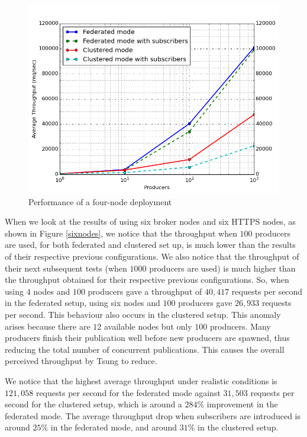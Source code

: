 \documentclass[conference, 10pt]{IEEEtran}
\begin{document}
\begin{figure}
 \includegraphics[width=\linewidth, height=\linewidth, keepaspectratio]{4-nodes.png}
\caption{Performance of a four-node deployment}
\label{fournodes}
\end{figure}

When we look at the results of using six broker nodes and six HTTPS nodes, as shown in Figure \ref{sixnodes}, we notice that the throughput when $100$ producers are used, for both federated and clustered set up, is much lower than the results of their respective previous configurations. We also notice that the throughput of their next subsequent tests (when $1000$ producers are used) is much higher than the throughput obtained for their respective previous configurations. So, when using $4$ nodes and $100$ producers gave a throughput of $40,417$ requests per second in the federated setup, using six nodes and $100$ producers gave $26,933$ requests per second. This behaviour also occurs in the clustered setup. This anomaly arises because there are $12$ available nodes but only $100$ producers. Many producers finish their publication well before new producers are spawned, thus reducing the total number of concurrent publications. This causes the overall perceived throughput by Tsung to reduce.  

We notice that the highest average throughput under realistic conditions is $121,058$ requests per second for the federated mode against $31,503$ requests per second for the clustered setup, which is around a $284\%$ improvement in the federated mode. The average throughput drop when subscribers are introduced is around $25\%$ in the federated mode, and around $31\%$ in the clustered setup.
\end{document}
